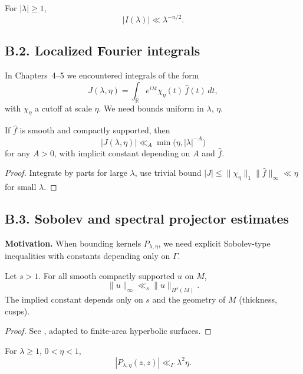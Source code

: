 \begin{corollary}\label{cor:uniform-stationary}
For $|\lambda|\ge 1$,
\[
|I(\lambda)| \ll \lambda^{-n/2}.
\]
\end{corollary}

\subsection*{B.2. Localized Fourier integrals}

\noindent
In Chapters~4--5 we encountered integrals of the form
\[
J(\lambda,\eta) = \int_{\mathbb R} e^{i\lambda t} \chi_\eta(t)\, \hat{f}(t)\,dt,
\]
with $\chi_\eta$ a cutoff at scale $\eta$. We need bounds uniform in $\lambda$,
$\eta$.

\begin{lemma}\label{lem:decay-local}
If $\hat{f}$ is smooth and compactly supported, then
\[
|J(\lambda,\eta)| \ll_A \min\big(\eta, |\lambda|^{-A}\big)
\]
for any $A>0$, with implicit constant depending on $A$ and $\hat{f}$.
\end{lemma}

\begin{proof}
Integrate by parts for large $\lambda$, use trivial bound $|J|\le \|\chi_\eta\|_1\|\hat{f}\|_\infty \ll \eta$ for small $\lambda$.
\end{proof}

\subsection*{B.3. Sobolev and spectral projector estimates}

\noindent
\textbf{Motivation.}
When bounding kernels $P_{\lambda,\eta}$, we need explicit Sobolev-type
inequalities with constants depending only on $\Gamma$.

\begin{lemma}\label{lem:sobolev-hyp}
Let $s>1$. For all smooth compactly supported $u$ on $M$,
\[
\|u\|_\infty \ll_s \|u\|_{H^s(M)}.
\]
The implied constant depends only on $s$ and the geometry of $M$ (thickness,
cusps).
\end{lemma}

\begin{proof}
See \cite[Thm.~2.1]{Iwaniec2002}, adapted to finite-area hyperbolic surfaces.
\end{proof}

\begin{corollary}\label{cor:proj-bound}
For $\lambda\ge 1$, $0<\eta<1$,
\[
|P_{\lambda,\eta}(z,z)| \ll_\Gamma \lambda^2 \eta.
\]
\end{corollary}

